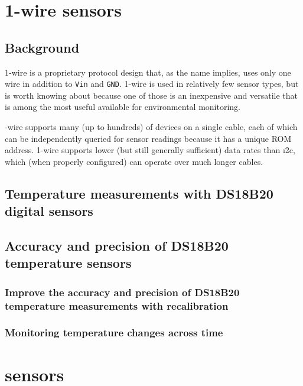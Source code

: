 \section{\color{gray}1-wire sensors \color{black}}
\subsection{\color{gray} Background \color{black}}
1-wire is a proprietary protocol design that, as the name implies, uses only one wire in addition to \texttt{Vin} and \texttt{GND}.
1-wire is used in relatively few sensor types, but is worth knowing about because one of those is an inexpensive and versatile  that is among the most useful available for environmental monitoring.

-wire supports many (up to hundreds) of devices on a single cable, each of which can be independently queried for sensor readings because it has a unique ROM address.
1-wire supports lower (but still generally sufficient) data rates than \i2c, which (when properly configured) can operate over much longer cables.

\subsection{\color{gray} Temperature measurements with DS18B20 digital sensors \color{black}}
\subsection{\color{gray} Accuracy and precision of DS18B20 temperature sensors \color{black}}
\subsubsection{\color{gray} Improve the accuracy and precision of DS18B20 temperature measurements with recalibration \color{black}}
\subsubsection{\color{gray} Monitoring temperature changes across time \color{black}}



\section{\color{gray}\uart sensors \color{black}}
